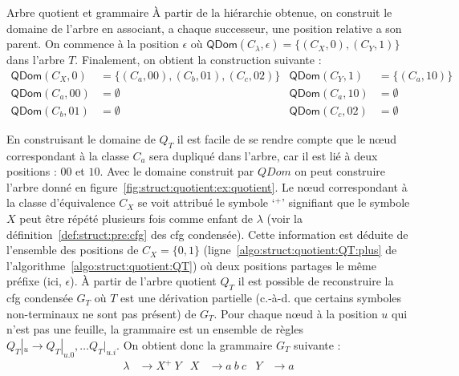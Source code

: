 \begin{example}{Arbre quotient et grammaire}
    À partir de la hiérarchie obtenue, on construit le domaine de l'arbre en associant, a chaque successeur, une position relative a son parent. On commence à la position $\epsilon$ où $\textsf{QDom}(C_\lambda, \epsilon) = \{(C_X, 0), (C_Y, 1)\}$ dans l'arbre $T$.
    Finalement, on obtient la construction suivante :
    \begin{align*}
        \textsf{QDom}(C_X, 0)  & = \{(C_a, 00), (C_b, 01), (C_c, 02)\} & \textsf{QDom}(C_Y, 1)  & = \{(C_a, 10)\} \\
        \textsf{QDom}(C_a, 00) & = \emptyset                           & \textsf{QDom}(C_a, 10) & = \emptyset     \\
        \textsf{QDom}(C_b, 01) & = \emptyset                           & \textsf{QDom}(C_c, 02) & = \emptyset
    \end{align*}

    En construisant le domaine de $Q_T$ il est facile de se rendre compte que le nœud correspondant à la classe $C_a$ sera dupliqué dans l'arbre, car il est lié à deux positions : $00$ et $10$.
    Avec le domaine construit par $QDom$ on peut construire l'arbre donné en figure~\ref{fig:struct:quotient:ex:quotient}.
    Le nœud correspondant à la classe d'équivalence $C_X$ se voit attribué le symbole `${}^+$' signifiant que le symbole $X$ peut être répété plusieurs fois comme enfant de $\lambda$ (voir la définition~\ref{def:struct:pre:cfg} des \gls{cfg} condensée).
    Cette information est déduite de l'ensemble des positions de $C_X = \{0, 1\}$ (ligne~\ref{algo:struct:quotient:QT:plus} de l'algorithme~\ref{algo:struct:quotient:QT}) où deux positions partages le même préfixe (ici, $\epsilon$).
    À partir de l'arbre quotient $Q_T$ il est possible de reconstruire la \gls{cfg} condensée $G_T$ où $T$ est une dérivation partielle (c.-à-d. que certains symboles non-terminaux ne sont pas présent) de $G_T$.
    Pour chaque nœud à la position $u$ qui n'est pas une feuille, la grammaire est un ensemble de règles $Q_T|_u \to Q_T|_{u.0}, \dots Q_T|_{u.i}$.
    On obtient donc la grammaire $G_T$ suivante :
    \begin{align*}
        \lambda & \to X^+ ~ Y & X & \to a ~ b ~ c & Y & \to a
    \end{align*}

\end{example}
